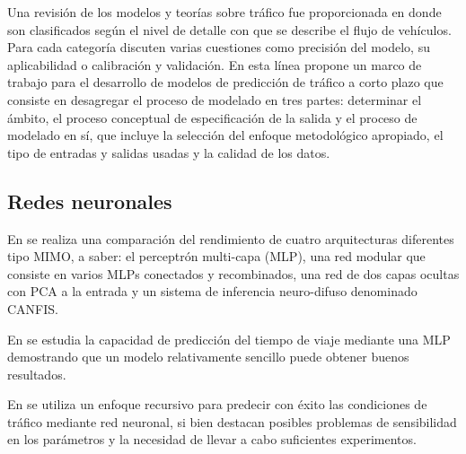 \documentclass{llncs}
\begin{document}
Una revisión de los modelos y teorías sobre tráfico fue proporcionada en \cite{Hoogendoorn2001283} donde son clasificados según el nivel de detalle con que se describe el flujo de vehículos. Para cada categoría discuten varias cuestiones como precisión del modelo, su aplicabilidad o calibración y validación.  En esta línea \cite{Vlahogianni2004533} propone un marco de trabajo para el desarrollo de modelos de predicción de tráfico a corto plazo que consiste en desagregar el proceso de modelado en tres partes: determinar el ámbito, el proceso conceptual de especificación de la salida y el proceso de modelado en sí, que incluye la selección del enfoque metodológico apropiado, el tipo de entradas y salidas usadas y la calidad de los datos. 


\subsection{Redes neuronales}


En \cite{Ishak2004452} se realiza una comparación del rendimiento de cuatro arquitecturas diferentes tipo MIMO, a saber: el perceptrón multi-capa (MLP), una red modular que consiste en varios MLPs conectados y recombinados, una red de dos capas ocultas con PCA a la entrada y un sistema de inferencia neuro-difuso denominado CANFIS.

En \cite{Innamaa2005649} se estudia la capacidad de predicción del tiempo de viaje mediante una MLP demostrando que un modelo relativamente sencillo puede obtener buenos resultados.

En \cite{Zhang2000472} se utiliza un enfoque recursivo para predecir con éxito las condiciones de tráfico mediante red neuronal, si bien destacan posibles problemas de sensibilidad en los parámetros y la necesidad de llevar a cabo suficientes experimentos.




\end{document}
